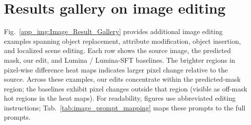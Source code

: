 \section{Results gallery on image editing}
\label{app:Image-Gallery}


Fig.~\ref{app_img:Image_Result_Gallery} provides additional image editing examples spanning object replacement, attribute modification, object insertion, and localized scene editing. Each row shows the source image, the predicted mask, our edit, and Lumina / Lumina-SFT baselines. The brighter regions in pixel-wise difference heat maps indicates larger pixel change relative to the source. Across these examples, our edits concentrate within the predicted-mask region; the baselines exhibit pixel changes outside that region (visible as off-mask hot regions in the heat maps). For readability, figures use abbreviated editing instructions; Tab.~\ref{tab:image_prompt_mapping} maps these prompts to the full prompts.

